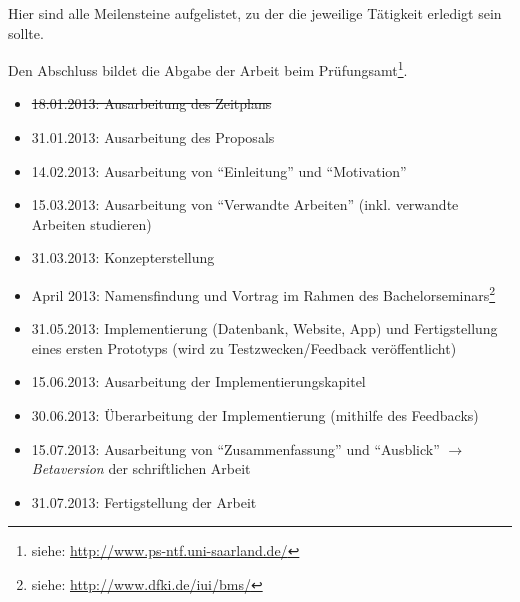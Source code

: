 \documentclass[a4paper]{report}
\begin{document}
Hier sind alle Meilensteine aufgelistet, zu der die jeweilige
Tätigkeit erledigt sein sollte.

Den Abschluss bildet die Abgabe der Arbeit beim Prüfungsamt\footnote{siehe:
\url{http://www.ps-ntf.uni-saarland.de/}}.

\begin{itemize}
	\item \sout{18.01.2013: Ausarbeitung des Zeitplans}
	\item 31.01.2013: Ausarbeitung des Proposals
	\item 14.02.2013: Ausarbeitung von ``Einleitung'' und ``Motivation''
	\item 15.03.2013: Ausarbeitung von ``Verwandte Arbeiten'' (inkl. verwandte
	Arbeiten studieren)
	\item 31.03.2013: Konzepterstellung
	\item April 2013: Namensfindung und Vortrag im Rahmen des
	Bachelorseminars\footnote{siehe:
	\url{http://www.dfki.de/iui/bms/}}
	\item 31.05.2013: Implementierung (Datenbank, Website, App) und
	Fertigstellung eines ersten Prototyps (wird zu
	Testzwecken/Feedback veröffentlicht)
	\item 15.06.2013: Ausarbeitung der Implementierungskapitel
	\item 30.06.2013: Überarbeitung der Implementierung (mithilfe des Feedbacks)
	\item 15.07.2013: Ausarbeitung von ``Zusammenfassung'' und
	``Ausblick'' $\rightarrow$ \textit{Betaversion} der schriftlichen Arbeit
	\item 31.07.2013: Fertigstellung der Arbeit
\end{itemize}
\end{document}
